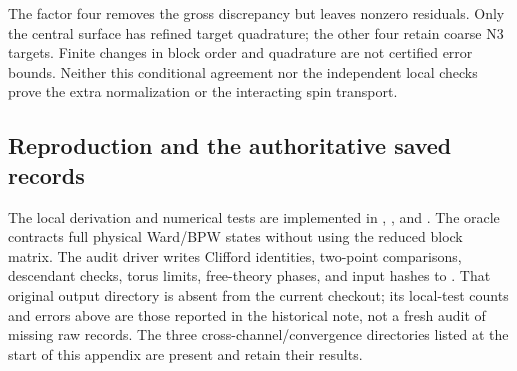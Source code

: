 The factor four removes the gross discrepancy but leaves
nonzero residuals. Only the central surface has refined
target quadrature; the other four retain coarse N3 targets.
Finite changes in block order and quadrature are not certified
error bounds. Neither this conditional agreement nor the
independent local checks prove the extra normalization or the
interacting spin transport.

\subsection{Reproduction and the authoritative saved records}

The local derivation and numerical tests are implemented in
,
, and
.
The oracle contracts full physical Ward/BPW states without
using the reduced block matrix. The audit driver writes Clifford identities, two-point comparisons,
descendant checks, torus limits, free-theory phases, and input
hashes to .
That original output directory is absent from the current checkout;
its local-test counts and errors above are those reported in the
historical note, not a fresh audit of missing raw records.
The three cross-channel/convergence directories listed at the
start of this appendix are present and retain their results.

